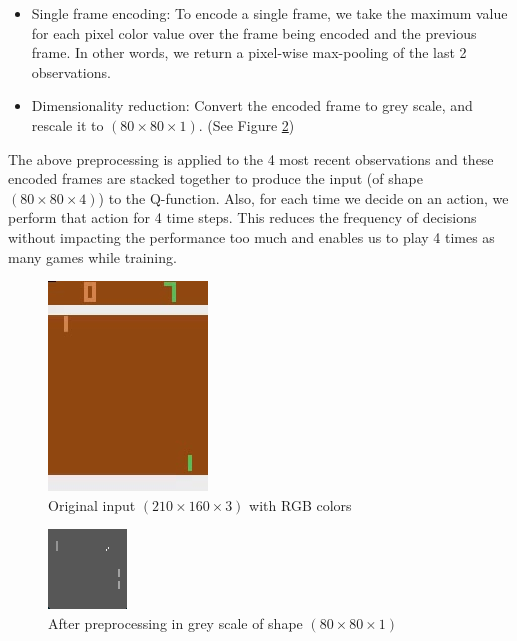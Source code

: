 \documentclass[11pt]{article}
\theoremstyle{case}
\begin{document}
\begin{itemize}
    \item Single frame encoding: To encode a single frame, we take the maximum value for each pixel color value over the frame being encoded and the previous frame. In other words, we return a pixel-wise max-pooling of the last 2 observations.  
    \item Dimensionality reduction: Convert the encoded frame to grey scale, and rescale it to $(80 \times 80 \times 1)$. (See Figure \ref{fig:pong_grey})
\end{itemize}

The above preprocessing is applied to the 4 most recent observations and these encoded frames are stacked together to produce the input (of shape $(80 \times 80 \times 4)$) to the Q-function. Also, for each time we decide on an action, we perform that action for 4 time steps. This reduces the frequency of decisions without impacting the performance too much and enables us to play 4 times as many games while training.

\begin{figure}[h!]
  \centering
  \includegraphics[width=.3\linewidth]{pong.jpg}
  \caption{Original input $ (210 \times 160 \times 3) $ with RGB colors}
  \label{fig:pong}
\end{figure}

\begin{figure}[h!]
  \centering
  \includegraphics[width=.3\linewidth]{pong_grey.png}
  \caption{After preprocessing in grey scale of shape $ (80 \times 80 \times 1 ) $}
  \label{fig:pong_grey}
\end{figure}
\end{document}
